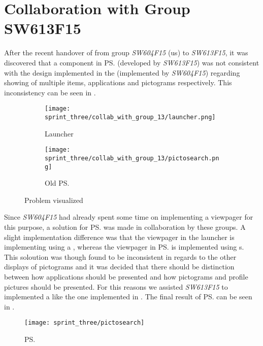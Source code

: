 
\section{Collaboration with Group SW613F15}
\label{sec:collaboration_with_group_sw613f15}

After the recent handover of \gc from group \emph{SW604F15} (us) to \emph{SW613F15}, it was discovered that a component in \ps (developed by \emph{SW613F15}) was not consistent with the design implemented in the \launcher (implemented by \emph{SW604F15}) regarding showing of multiple items, applications and pictograms respectively. This inconsistency can be seen in .

\begin{figure}[!htbp]
    \centering

    \begin{subfigure}[t]{0.75\textwidth}
        \texttt{[image: sprint\_three/collab\_with\_group\_13/launcher.png]}
        \caption{Launcher}
        \label{fig:collab_with_group_13_launhcer}
        \vspace*{1cm}
    \end{subfigure}
    \hfill
    \begin{subfigure}[t]{0.75\textwidth}
        \texttt{[image: sprint\_three/collab\_with\_group\_13/pictosearch.png]}
        \caption{Old \ps}
        \label{fig:collab_with_group_13_pictosearch}
    \end{subfigure}
    
    \caption{Problem visualized}
    \label{fig:collab_with_group_13}
\end{figure}

Since \emph{SW604F15} had already spent some time on implementing a viewpager for this purpose, a solution for \ps was made in collaboration by these groups. A slight implementation difference was that the viewpager in the launcher is implementing using a , whereas the viewpager in \ps is implemented using s. This soloution was though found to be inconsistent in regards to the other displays of pictograms and it was decided that there should be distinction between how applications should be presented and how pictograms and profile pictures should be presented. For this reasons we assisted \emph{SW613F15} to implemented a  like the one implemented in \ct. The final result of \ps can be seen in .


\begin{figure}[!htbp]
    \centering
    \texttt{[image: sprint\_three/pictosearch]}
    \caption{\ps}
    \label{fig:pictosearch}
\end{figure}